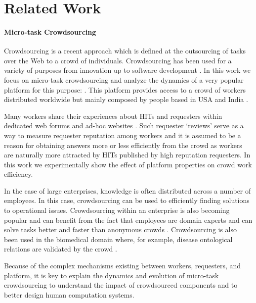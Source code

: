 \section{Related Work}\label{sec:relwork}

\paragraph{Micro-task Crowdsourcing}
Crowdsourcing is a recent approach which is defined at the  outsourcing of tasks over the Web to a crowd of individuals. Crowdsourcing has  been used for a variety of purposes from innovation up to software development \cite{platforms}.
% 
In this work we focus on micro-task crowdsourcing and analyze the dynamics of a  very popular  platform for this purpose: \amt. This platform provides access to a crowd of workers distributed worldwide but mainly composed by people based in USA and India \cite{mturk}.

Many \amt workers share their experiences about HITs and requesters within dedicated web forums and ad-hoc websites \cite{turkopticon}. Such requester `reviews' serve as a way to measure requester reputation among workers and it is assumed to be a reason for obtaining answers more or less efficiently from the crowd \cite{TOreputation} as workers are naturally more attracted by HITs published by high reputation requesters.
% 
In this work we experimentally show the effect of  platform  properties on crowd work efficiency.

In the case of large enterprises,  knowledge is often distributed across a number of employees. In this case, crowdsourcing can be used to efficiently finding solutions to operational issues. Crowdsourcing within an enterprise is also becoming popular and can benefit from the fact that employees are domain experts and can solve tasks better and faster than anonymous crowds  \cite{enterprisecrowdsourcing}. 
% 
Crowdsourcing is also been used in the biomedical domain where, for example, disease ontological relations are validated by the crowd \cite{bioonto,biomedical}.

Because of the complex mechanisms existing between workers, requesters, and platform, it is key to explain the dynamics and evolution of micro-task crowdsourcing to understand  the impact of  crowdsourced components and to better design human computation systems.



